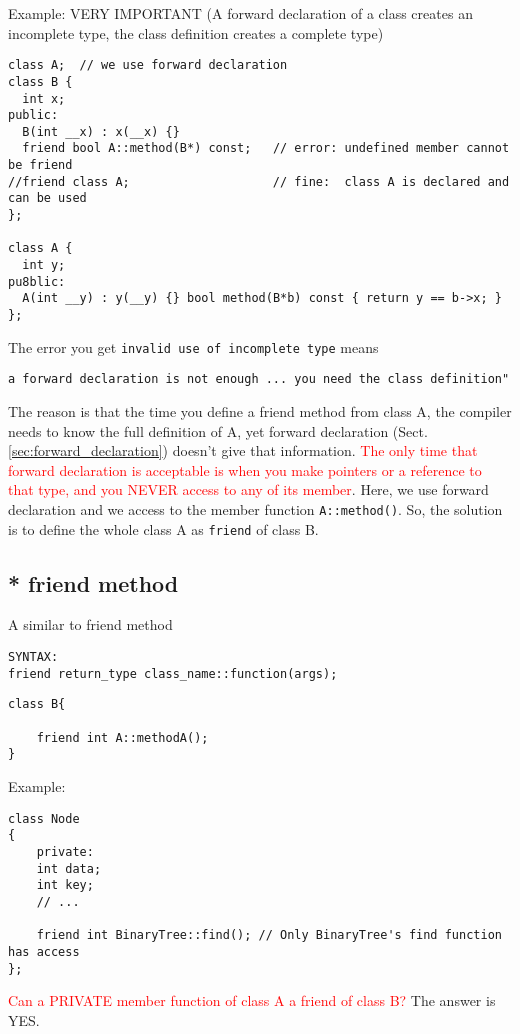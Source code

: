 Example: VERY IMPORTANT (A forward declaration of a class creates an incomplete
type, the class definition creates a complete type)
\begin{verbatim}
class A;  // we use forward declaration 
class B {
  int x;
public:
  B(int __x) : x(__x) {}
  friend bool A::method(B*) const;   // error: undefined member cannot be friend
//friend class A;                    // fine:  class A is declared and can be used
};

class A {
  int y;
pu8blic:
  A(int __y) : y(__y) {} bool method(B*b) const { return y == b->x; }
};
\end{verbatim}
The error you get \verb!invalid use of incomplete type! means
\begin{verbatim}
a forward declaration is not enough ... you need the class definition"
\end{verbatim}
The reason is that the time you define a friend method from class A, the
compiler needs to know the full definition of A, yet forward declaration
(Sect.\ref{sec:forward_declaration}) doesn't give that information.
\textcolor{red}{The only time that forward declaration is acceptable is when you
make pointers or a reference to that type, and you NEVER access to any of its
member}. Here, we use forward declaration and we access to the member function
\verb!A::method()!. So, the solution is to define the whole class A as
\verb!friend! of class B. 

\subsection{* friend method}

A similar to friend method
\begin{verbatim}
SYNTAX: 
friend return_type class_name::function(args); 
\end{verbatim}


\begin{verbatim}
class B{

    friend int A::methodA();
}
\end{verbatim}

Example:
\begin{verbatim}
class Node 
{
    private: 
    int data;
    int key;
    // ...

    friend int BinaryTree::find(); // Only BinaryTree's find function has access
};
\end{verbatim}

\begin{framed}
\textcolor{red}{Can a PRIVATE member function of class A a friend of class B?}
The answer is YES.
\end{framed}


